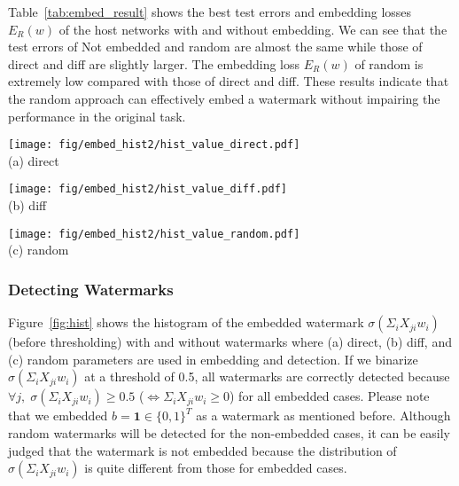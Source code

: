 \documentclass[10pt,twocolumn,letterpaper]{article}
\begin{document}
Table~\ref{tab:embed_result} shows the best test errors and embedding losses $E_R (w)$ of the host networks with and without embedding.
We can see that the test errors of \textsf{Not embedded} and \textsf{random} are almost the same while those of \textsf{direct} and \textsf{diff} are slightly larger.
The embedding loss $E_R (w)$ of \textsf{random} is extremely low compared with those of \textsf{direct} and \textsf{diff}.
These results indicate that the \textsf{random} approach can effectively embed a watermark without impairing the performance in the original task.




\begin{figure*}[tb]
	\centering
	\begin{minipage}[b]{0.33\linewidth}
		\texttt{[image: fig/embed\_hist2/hist\_value\_direct.pdf]} \\
	\centering (a) \textsf{direct}
	\end{minipage}
	\begin{minipage}[b]{0.33\linewidth}
		\texttt{[image: fig/embed\_hist2/hist\_value\_diff.pdf]} \\
	\centering (b) \textsf{diff}
	\end{minipage}
	\begin{minipage}[b]{0.33\linewidth}
		\texttt{[image: fig/embed\_hist2/hist\_value\_random.pdf]} \\
	\centering (c) \textsf{random}
	\end{minipage}
	\caption{Histogram of the embedded watermark $\sigma(\Sigma_{i} X_{ji} w_i)$ (before thresholding) with and without watermarks.}
	\label{fig:hist}
\end{figure*}




\subsubsection{Detecting Watermarks}
Figure~\ref{fig:hist} shows the histogram of the embedded watermark $\sigma(\Sigma_{i} X_{ji} w_i)$ (before thresholding) with and without watermarks where (a) \textsf{direct}, (b) \textsf{diff}, and (c) \textsf{random} parameters are used in embedding and detection.
If we binarize $\sigma(\Sigma_{i} X_{ji} w_i)$ at a threshold of 0.5, all watermarks are correctly detected because $\forall j, \; \sigma(\Sigma_{i} X_{ji} w_i) \ge 0.5$ ($\Leftrightarrow \Sigma_{i} X_{ji} w_i \ge 0$) for all embedded cases.
Please note that we embedded $b = \mathbf{1} \in \{0, 1\}^{T}$ as a watermark as mentioned before.
Although random watermarks will be detected for the non-embedded cases, it can be easily judged that the watermark is not embedded because the distribution of $\sigma(\Sigma_{i} X_{ji} w_i)$ is quite different from those for embedded cases.
\end{document}
